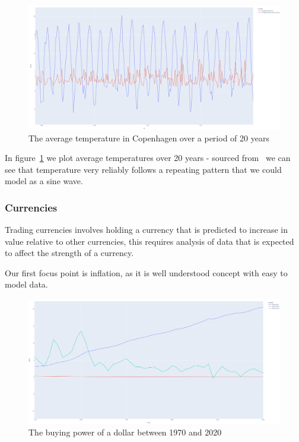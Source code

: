 \begin{figure}[H]
    \centering
    \includegraphics[width=12cm]{figures/real_data_examples/cph_average_temp}
    \caption{The average temperature in Copenhagen over a period of 20 years}
    \label{fig:real_data_climate_cph}
\end{figure}

In figure~\ref{fig:real_data_climate_cph} we plot average temperatures over 20 years - sourced from~\cite{KaggleTemperature}
we can see that temperature very reliably follows a repeating pattern that we could model as a sine wave.

\subsubsection{Currencies}

Trading currencies involves holding a currency that is predicted to increase in value relative to other currencies,
this requires analysis of data that is expected to affect the strength of a currency.

Our first focus point is inflation, as it is well understood concept with easy to model data.

\begin{figure}[H]
    \centering
    \includegraphics[width=12cm]{figures/real_data_examples/dollar_value_statistics}
    \caption{The buying power of a dollar between 1970 and 2020}
    \label{fig:real_data_inflation}
\end{figure}

